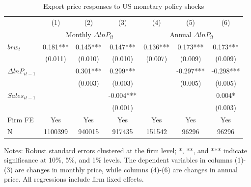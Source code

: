 \begin{table}[htbp]
    \centering
    \caption{Export price responses to US monetary policy shocks}
    \begin{threeparttable}
    \begin{tabular}{lcccccc}
        \toprule
        & (1)   & (2)   & (3)   & (4)   & (5)   & (6) \\
        & \multicolumn{3}{c}{Monthly $\Delta ln P_{it}$} & \multicolumn{3}{c}{Annual $\Delta ln P_{it}$}  \\
        \midrule
        $brw_t$   & 0.181*** & 0.145*** & 0.147*** & 0.136*** & 0.173*** & 0.173*** \\
              & (0.011) & (0.010) & (0.010) & (0.007) & (0.009) & (0.009) \\
        $\Delta ln P_{it-1}$ &       & 0.301*** & 0.299*** &       & -0.297*** & -0.298***  \\
              &       & (0.003) & (0.003) &       & (0.005) & (0.005) \\
        $Sales_{it-1}$ &       &       & -0.004*** &       &       &  0.004*\\
              &       &       & (0.001) &       &       &  (0.003)\\
        \midrule
        Firm FE & Yes   & Yes   & Yes   & Yes   & Yes   & Yes \\
        N     & 1100399 & 940015 & 917435 & 151542 & 96296 & 96296 \\
        \bottomrule
    \end{tabular}
        \begin{tablenotes}
            \footnotesize
            \item Notes: Robust standard errors clustered at the firm level;  *, **, and *** indicate significance at 10\%, 5\%, and 1\% levels. The dependent variables in columns (1)-(3) are changes in monthly price, while columns (4)-(6) are changes in annual price. All regressions include firm fixed effects.
	\end{tablenotes}
    \end{threeparttable}
    \label{tab.baseline}
\end{table}

